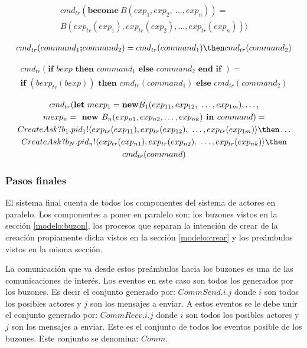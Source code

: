 \begin{multline*}
cmd_{tr} (\textbf{become}\ B(exp_1, exp_2,\ \ldots, exp_n)) = \\
B(exp_{tr}(exp_1), exp_{tr}(exp_2), \ldots, exp_{tr}(exp_n)) \rangle
\end{multline*}

\begin{multline*}
cmd_{tr} (command_1 \textbf{;} command_2) = cmd_{tr}(command_1) \then cmd_{tr}(command_2)
\end{multline*}

\begin{multline*}
cmd_{tr} (\textbf{if } bexp \textbf{ then } command_1 \textbf{ else } command_2 \textbf{ end if }) = \\
\textbf{if } (bexp_{tr}(bexp))\textbf{ then } cmd_{tr}(command_1) \textbf{ else } cmd_{tr}(command_2)
\end{multline*}

\begin{multline*}
cmd_{tr}( \textbf{let}\ mexp_1 = \textbf{new} B_1(exp_{11}, exp_{12},\ \ldots, exp_{1m}), \ldots, \\
mexp_n = \textbf{ new }B_n(exp_{n1}, exp_{n2},\ldots, exp_{nk}) \textbf{ in }command) = \\
CreateAsk?b_1.pid_1! \langle exp_{tr}(exp_{11}), exp_{tr}(exp_{12}),\ \ldots, exp_{tr}(exp_{1m}) \rangle \then \ldots \\
CreateAsk?b_N.pid_n! \langle exp_{tr}(exp_{n1}), exp_{tr}(exp_{n2}),\ \ldots, exp_{tr}(exp_{nk}) \rangle \then  \\ 
cmd_{tr}(command)
\end{multline*}

\subsubsection*{Pasos finales}

El sistema final cuenta de todos los componentes del sistema de actores en paralelo. Los componentes a poner en paralelo son: los buzones vistos en la sección \ref{modelo:buzon}, los procesos que separan la intención de crear de la creación propiamente dicha vistos en la sección \ref{modelo:crear} y los preámbulos vistos en la misma sección.

La comunicación que va desde estos preámbulos hacia los buzones es una de las comunicaciones de interés. Los eventos en este caso son todos los generados por los buzones. Es decir el conjunto generado por: $CommSend.i.j$ donde $i$ son todos los posibles actores y $j$ son los mensajes a enviar. A estos eventos se le debe unir el conjunto generado por: $CommRecv.i.j$ donde $i$ son todos los posibles actores y $j$ son los mensajes a enviar. Este es el conjunto de todos los eventos posible de los buzones. Este conjunto se denomina: $Comm$.

